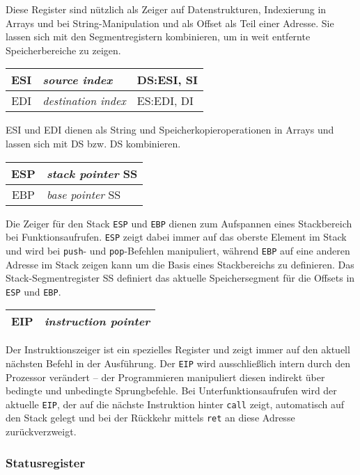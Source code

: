 Diese Register sind nützlich als Zeiger auf Datenstrukturen, Indexierung in Arrays und bei String-Manipulation und als Offset als Teil einer Adresse. Sie lassen sich mit den Segmentregistern kombinieren, um in weit entfernte Speicherbereiche zu zeigen. 

\begin{tabular}{|c|l|l|}
\hline ESI & \emph{source index} & DS:ESI, SI\\
\hline EDI & \emph{destination index} & ES:EDI, DI\\
\hline
\end{tabular}

ESI und EDI dienen als String und Speicherkopieroperationen in Arrays und lassen sich mit DS bzw. DS kombinieren.

\begin{tabular}{|c|l|}
\hline ESP & \emph{stack pointer} SS\\
\hline EBP & \emph{base pointer} SS\\
\hline
\end{tabular}

Die Zeiger für den Stack {\tt ESP} und {\tt EBP} dienen zum Aufspannen eines Stackbereich bei Funktionsaufrufen. {\tt ESP} zeigt dabei immer auf das oberste Element im Stack und wird bei {\tt push}- und {\tt pop}-Befehlen manipuliert, während {\tt EBP} auf eine anderen Adresse im Stack zeigen kann um die Basis eines Stackbereichs zu definieren. Das Stack-Segmentregister SS definiert das aktuelle Speichersegment für die Offsets in {\tt ESP} und {\tt EBP}.

\begin{tabular}{|c|l|}
\hline EIP & \emph{instruction pointer} \\
\hline
\end{tabular}

Der Instruktionszeiger ist ein spezielles Register und zeigt immer auf den aktuell nächsten Befehl in der Ausführung. Der {\tt EIP} wird ausschließlich intern durch den Prozessor verändert – der Programmieren manipuliert diesen indirekt über bedingte und unbedingte Sprungbefehle. Bei Unterfunktionsaufrufen wird der aktuelle {\tt EIP}, der  auf die nächste Instruktion hinter {\tt call} zeigt, automatisch auf den Stack gelegt und bei der Rückkehr mittels {\tt ret} an diese Adresse zurückverzweigt.

\subsubsection{Statusregister}

